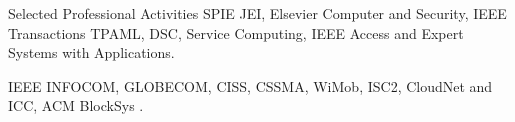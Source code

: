 \begin{rubric}{Selected Professional Activities}
\entry*[]
SPIE JEI, Elsevier Computer and Security, IEEE Transactions TPAML, DSC, Service Computing, IEEE Access and Expert Systems with Applications.

%
\entry*[]
IEEE INFOCOM, GLOBECOM, CISS, CSSMA, WiMob, ISC2, CloudNet and ICC, ACM BlockSys .

%
\end{rubric}